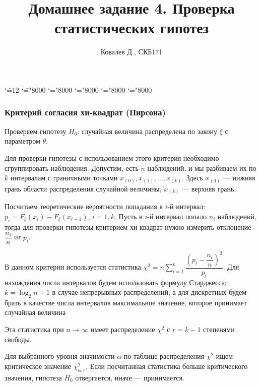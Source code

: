 \documentclass[11pt]{article}
\title{Домашнее задание 4. Проверка статистических гипотез}
\author{Ковалев Д., СКБ171}
\date{}
\begin{document}
    
    \begingroup \catcode`\"=12
    \gdef\newmcodes@{\mathcode`\'39\mathcode`\*42\mathcode`\."613A%
    	\mathcode`\-"8000\mathcode`\/47\mathcode`\:"603A\relax}%
    \endgroup
    \mathcode`\=="8000 \mathcode`\+="8000 \mathcode`\-="8000
    \mathcode`\<="8000 \mathcode`\>="8000
    
    \maketitle
    

    \hypertarget{ux43aux440ux438ux442ux435ux440ux438ux439-ux441ux43eux433ux43bux430ux441ux438ux44f-ux445ux438-ux43aux432ux430ux434ux440ux430ux442-ux43fux438ux440ux441ux43eux43dux430}{%
\subsubsection*{Критерий согласия хи-квадрат
(Пирсона)}\label{ux43aux440ux438ux442ux435ux440ux438ux439-ux441ux43eux433ux43bux430ux441ux438ux44f-ux445ux438-ux43aux432ux430ux434ux440ux430ux442-ux43fux438ux440ux441ux43eux43dux430}}

Проверяем гипотезу \(H_0\): случайная величина распределена по закону
\(\xi\) с параметром \(\theta\).

Для проверки гипотезы с использованием этого критерия необходимо
сгруппировать наблюдения. Допустим, есть \(n\) наблюдений, и мы
разбиваем их по \(k\) интервалам с граничными точками
\(x_{(0)},x_{(1)},\ldots,x_{(k)}\). Здесь \(x_{(0)}\) --- нижняя грань
области распределения случайной величины, \(x_{(k)}\) --- верхняя грань.

Посчитаем теоретические вероятности попадания в \(i\)-й интервал:
\(p_i=F_{\xi}\left(x_i\right)-F_{\xi}\left(x_{i-1}\right)\),
\(i=\overline{1,k}\). Пусть в \(i\)-й интервал попало \(n_i\)
наблюдений, тогда для проверки гипотезы критерием хи-квадрат нужно
измерить отклонение \(\dfrac{n_i}{n}\) от \(p_i\).

В данном критерии используется статистика
\(\chi^2=n\sum\limits_{i=1}^{k}\dfrac{\left(p_i-\dfrac{n_i}{n}\right)^2}{p_i}\).
Для нахождения числа интервалов будем использовать формулу Старджесса:
\(k=\log_2{n}+1\) в случае непрерывных распределений, а для дискретных
будем брать в качестве числа интервалов максимальное значение, которое
принимает случайная величина

Эта статистика при \(n\rightarrow \infty\) имеет распределение
\(\chi^2\) с \(r=k-1\) степенями свободы.

Для выбранного уровня значимости \(\alpha\) по таблице распределения
\(\chi^2\) ищем критическое значение \(\chi^2_{\alpha,r}\). Если
посчитанная статистика больше критического значения, гипотеза \(H_0\)
отвергается, иначе --- принимается.
\end{document}
